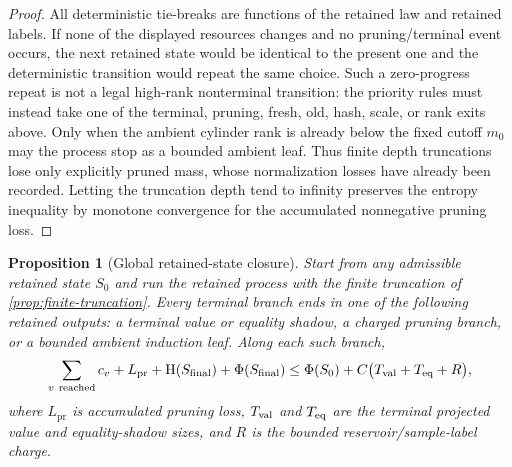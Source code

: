 \documentclass[11pt]{article}
\newcommand{\Cref}[1]{\ref{#1}}
\newtheorem{proposition}[theorem]{Proposition}
\theoremstyle{remark}
\newcommand{\HH}{\mathrm H}
\newcommand{\pr}{\mathrm{pr}}
\begin{document}
\begin{proof}
All deterministic tie-breaks are functions of the retained law and retained labels.  If none of the displayed resources changes and no pruning/terminal event occurs, the next retained state would be identical to the present one and the deterministic transition would repeat the same choice.  Such a zero-progress repeat is not a legal high-rank nonterminal transition: the priority rules must instead take one of the terminal, pruning, fresh, old, hash, scale, or rank exits above.  Only when the ambient cylinder rank is already below the fixed cutoff $m_0$ may the process stop as a bounded ambient leaf.  Thus finite depth truncations lose only explicitly pruned mass, whose normalization losses have already been recorded.  Letting the truncation depth tend to infinity preserves the entropy inequality by monotone convergence for the accumulated nonnegative pruning loss.
\end{proof}

\begin{proposition}[Global retained-state closure]\label{prop:global-retained-closure}
Start from any admissible retained state $S_0$ and run the retained process with the finite truncation of \Cref{prop:finite-truncation}.  Every terminal branch ends in one of the following retained outputs: a terminal value or equality shadow, a charged pruning branch, or a bounded ambient induction leaf.  Along each such branch,
\[
        \sum_{v\ {\rm reached}} c_v+L_{\pr}+\HH(S_{\rm final})+\Phi(S_{\rm final})
        \le \Phi(S_0)+C\bigl(T_{\rm val}+T_{\rm eq}+R\bigr),
\]
where $L_{\pr}$ is accumulated pruning loss, $T_{\rm val}$ and $T_{\rm eq}$ are the terminal projected value and equality-shadow sizes, and $R$ is the bounded reservoir/sample-label charge.
\end{proposition}
\end{document}
